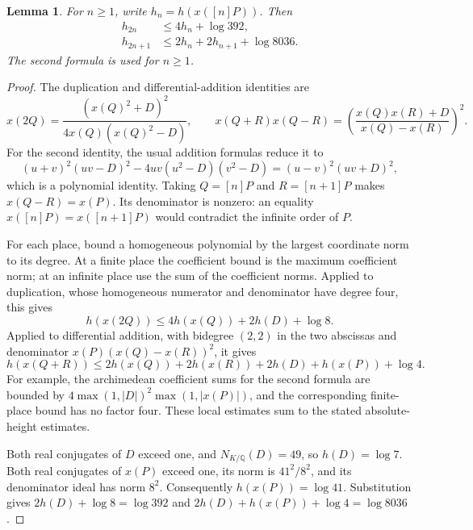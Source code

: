\documentclass[11pt,a4paper]{article}
\newtheorem{lemma}[theorem]{Lemma}
\theoremstyle{definition}
\theoremstyle{remark}
\begin{document}
\begin{lemma}\label{lem:fixed-height-recurrences}
For $n\ge1$, write $h_n=h(x([n]P))$. Then
\[
 \begin{aligned}
 h_{2n}&\le4h_n+\log392,\\
 h_{2n+1}&\le2h_n+2h_{n+1}+\log8036.
 \end{aligned}
\]
The second formula is used for $n\ge1$.
\end{lemma}
\begin{proof}
The duplication and differential-addition identities are
\[
 x(2Q)=\frac{(x(Q)^2+D)^2}{4x(Q)(x(Q)^2-D)},
 \qquad
 x(Q+R)x(Q-R)=
       \left(\frac{x(Q)x(R)+D}{x(Q)-x(R)}\right)^2.
\]
For the second identity, the usual addition formulas reduce it to
\[
 (u+v)^2(uv-D)^2-4uv(u^2-D)(v^2-D)
                    =(u-v)^2(uv+D)^2,
\]
which is a polynomial identity. Taking $Q=[n]P$ and
$R=[n+1]P$ makes $x(Q-R)=x(P)$. Its denominator is nonzero:
an equality $x([n]P)=x([n+1]P)$ would contradict the infinite
order of $P$.

For each place, bound a homogeneous polynomial by the largest
coordinate norm to its degree. At a finite place the coefficient
bound is the maximum coefficient norm; at an infinite place use
the sum of the coefficient norms. Applied to duplication, whose
homogeneous numerator and denominator have degree four, this gives
\[
             h(x(2Q))\le4h(x(Q))+2h(D)+\log8.
\]
Applied to differential addition, with bidegree $(2,2)$ in the two
abscissas and denominator $x(P)(x(Q)-x(R))^2$, it gives
\[
 h(x(Q+R))\le2h(x(Q))+2h(x(R))+2h(D)+h(x(P))+\log4.
\]
For example, the archimedean coefficient sums for the second
formula are bounded by
$4\max(1,|D|)^2\max(1,|x(P)|)$, and the corresponding finite-place
bound has no factor four. These local estimates sum to the stated
absolute-height estimates.

Both real conjugates of $D$ exceed one, and $N_{K/\mathbb Q}(D)=49$,
so $h(D)=\log7$. Both real conjugates of $x(P)$ exceed one, its
norm is $41^2/8^2$, and its denominator ideal has norm $8^2$.
Consequently $h(x(P))=\log41$. Substitution gives
$2h(D)+\log8=\log392$ and
$2h(D)+h(x(P))+\log4=\log8036$.
\end{proof}
\end{document}
